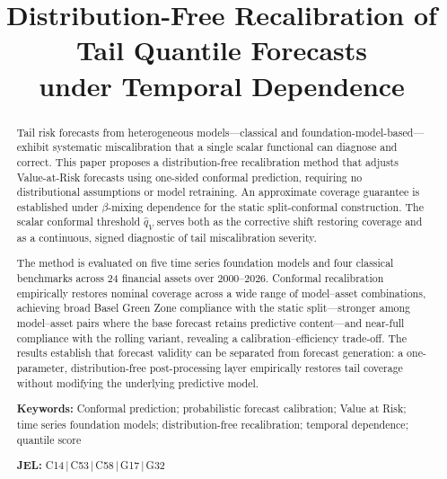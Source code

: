 \documentclass[preprint,11pt,authoryear]{elsarticle}
\newcommand{\1}{\boldsymbol{1}}
\begin{document}
	
	\begin{frontmatter}
		
		\title{Distribution-Free Recalibration of Tail Quantile Forecasts\\
			under Temporal Dependence}
		
		
		\begin{abstract}
			Tail risk forecasts from heterogeneous models---classical and foundation-model-based---exhibit systematic miscalibration that a single scalar functional can diagnose and correct. This paper proposes a distribution-free recalibration method that adjusts Value-at-Risk forecasts using one-sided conformal prediction, requiring no distributional assumptions or model retraining. An approximate coverage guarantee is established under $\beta$-mixing dependence for the static split-conformal construction. The scalar conformal threshold $\hat{q}_V$ serves both as the corrective shift restoring coverage and as a continuous, signed diagnostic of tail miscalibration severity.

			The method is evaluated on five time series foundation models and four classical benchmarks across 24 financial assets over 2000--2026. Conformal recalibration empirically restores nominal coverage across a wide range of model--asset combinations, achieving broad Basel Green Zone compliance with the static split---stronger among model--asset pairs where the base forecast retains predictive content---and near-full compliance with the rolling variant, revealing a calibration--efficiency trade-off. The results establish that forecast validity can be separated from forecast generation: a one-parameter, distribution-free post-processing layer empirically restores tail coverage without modifying the underlying predictive model.

			\bigskip\noindent
			\textbf{Keywords:} Conformal prediction; probabilistic forecast calibration; Value at Risk; time series foundation models; distribution-free recalibration; temporal dependence; quantile score

			\bigskip\noindent
			\textbf{JEL:} C14\,|\,C53\,|\,C58\,|\,G17\,|\,G32
		\end{abstract}
		
	\end{frontmatter}
	
\end{document}
